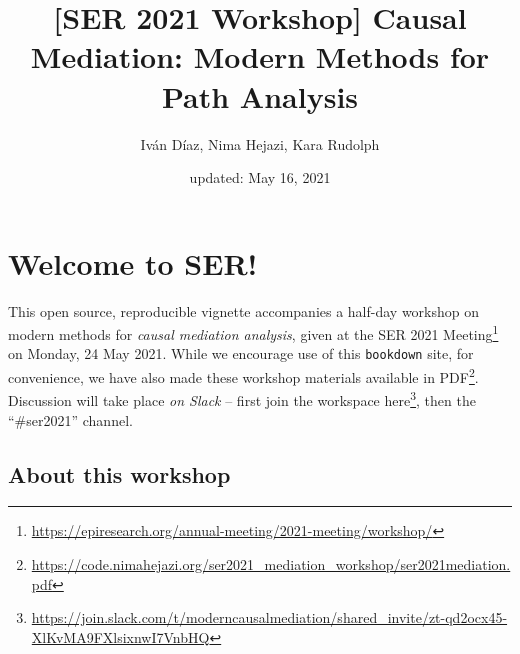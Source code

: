 \documentclass[
  12pt,
]{book}
\title{{[}SER 2021 Workshop{]} Causal Mediation: Modern Methods for Path Analysis}
\author{Iván Díaz, Nima Hejazi, Kara Rudolph}
\date{updated: May 16, 2021}
\newcommand{\passthrough}[1]{#1}
\renewcommand{\href}[2]{#2\footnote{\url{#1}}}
\theoremstyle{definition}
\theoremstyle{definition}
\theoremstyle{definition}
\newcommand{\1}{\mathbbm{1}}
\begin{document}
\maketitle


\thispagestyle{empty}

\begin{center}
\end{center}

\setlength{\abovedisplayskip}{-5pt}
\setlength{\abovedisplayshortskip}{-5pt}

\mainmatter

{
\hypersetup{linkcolor=}
\setcounter{tocdepth}{2}
\tableofcontents
}
\hypertarget{welcome-to-ser}{%
\chapter*{Welcome to SER!}\label{welcome-to-ser}}


This open source, reproducible vignette accompanies a half-day workshop on
modern methods for \emph{causal mediation analysis}, given at the \href{https://epiresearch.org/annual-meeting/2021-meeting/workshop/}{SER 2021
Meeting} on
Monday, 24 May 2021. While we encourage use of this \passthrough{\lstinline!bookdown!} site, for
convenience, we have also made these workshop materials \href{https://code.nimahejazi.org/ser2021_mediation_workshop/ser2021mediation.pdf}{available in
PDF}.
Discussion will take place \emph{on Slack} -- first join the workspace
\href{https://join.slack.com/t/moderncausalmediation/shared_invite/zt-qd2ocx45-XlKvMA9FXlsixnwI7VnbHQ}{here},
then the ``\#ser2021'' channel.

\hypertarget{about}{%
\section{About this workshop}\label{about}}
\end{document}
